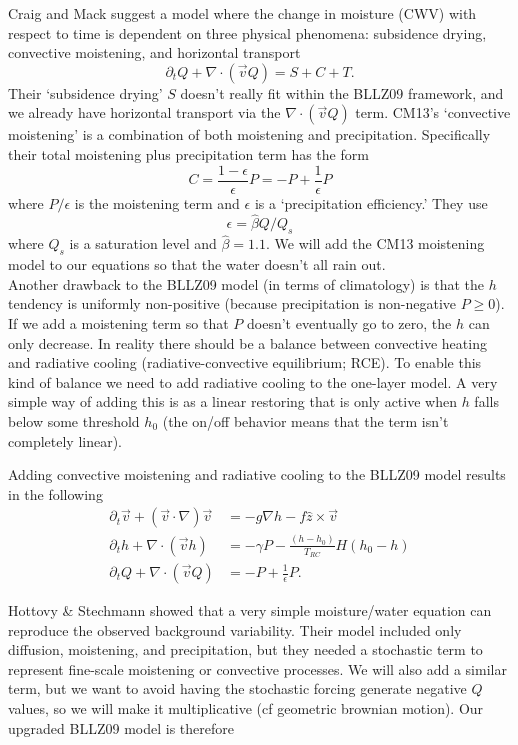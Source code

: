 \documentclass[10pt]{article}
\begin{document}
Craig and Mack suggest a model where the change in moisture (CWV) with respect to time is dependent on three physical phenomena: subsidence drying, convective moistening, and horizontal transport
\[\partial_t Q + \nabla \cdot \left(\vec{v}Q\right) = S + C + T.\]
Their `subsidence drying' $S$ doesn't really fit within the BLLZ09 framework, and we already have horizontal transport via the $\nabla\cdot(\vec{v}Q)$ term.
CM13's `convective moistening' is a combination of both moistening and precipitation.
Specifically their total moistening plus precipitation term has the form
\[C = \frac{1-\epsilon}{\epsilon} P = -P +\frac{1}{\epsilon}P\]
where $P/\epsilon$ is the moistening term and $\epsilon$ is a `precipitation efficiency.'
They use 
\[\epsilon = \hat{\beta}Q/Q_s\]
where $Q_s$ is a saturation level and $\hat{\beta} = 1.1$.
We will add the CM13 moistening model to our equations so that the water doesn't all rain out.\\

Another drawback to the BLLZ09 model (in terms of climatology) is that the $h$ tendency is uniformly non-positive (because precipitation is non-negative $P\ge0$).
If we add a moistening term so that $P$ doesn't eventually go to zero, the $h$ can only decrease.
In reality there should be a balance between convective heating and radiative cooling (radiative-convective equilibrium; RCE).
To enable this kind of balance we need to add radiative cooling to the one-layer model.
A very simple way of adding this is as a linear restoring that is only active when $h$ falls below some threshold $h_0$ (the on/off behavior means that the term isn't completely linear).

Adding convective moistening and radiative cooling to the BLLZ09 model results in the following
\begin{align}
\partial_t \vec{v} + \left( \vec{v}\cdot \nabla \right)\vec{v} &= -g\nabla h - f\hat{z}\times \vec{v}\\
\partial_t h + \nabla \cdot \left(\vec{v}h\right) &= -\gamma P -\frac{(h-h_0)}{T_{RC}}H(h_0-h)\\
\partial_t Q + \nabla \cdot \left(\vec{v}Q\right) &= -P + \frac{1}{\epsilon}P.
\end{align}

Hottovy \& Stechmann showed that a very simple moisture/water equation can reproduce the observed background variability.
Their model included only diffusion, moistening, and precipitation, but they needed a stochastic term to represent fine-scale moistening or convective processes.
We will also add a similar term, but we want to avoid having the stochastic forcing generate negative $Q$ values, so we will make it multiplicative (cf geometric brownian motion).
Our upgraded BLLZ09 model is therefore
\end{document}
